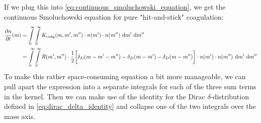     If we plug this into \cref{eq:continuous_smoluchowski_equation}, we get the 
    continuous Smoluchowski equation for pure "hit-and-stick" coagulation:
    \begin{align}
        \frac{\partial n}{\partial t}(m)
            &=
                \int\limits_0^\infty
                \int\limits_0^\infty
                K_\text{coag}(m,m',m'')
                \cdot n(m')
                \cdot n(m'')
                \ \text{d} m'
                \ \text{d} m''
        \\
            &=
                \int\limits_0^\infty
                \int\limits_0^\infty
                R(m',m'') \cdot \frac{1}{2}
                \bigg[
                    \delta_D(m-m'-m'') - \delta_D(m-m') - \delta_D(m-m'')
                \bigg]
                \cdot n(m')
                \cdot n(m'')
                \ \text{d} m'
                \ \text{d} m''
    \end{align}
    To make this rather space-consuming equation a bit more manageable, we can 
    pull apart the expression into a separate integrals for each of the three 
    sum terms in the kernel. Then we can make use of the identity for the Dirac 
    $\delta$-distribution defined in \cref{eq:dirac_delta_identity} and collapse 
    one of the two integrals over the mass axis. 
